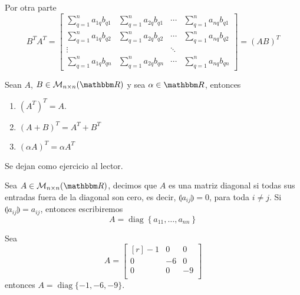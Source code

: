 \begin{theorem}
    Por otra parte
    $$B^T A^T = \begin{bmatrix}
        \displaystyle\sum_{q=1}^{n} a_{1q}b_{q1} & \displaystyle\sum_{q=1}^{n} a_{2q}b_{q1} & \cdots & \displaystyle\sum_{q=1}^{n} a_{nq}b_{q1} \\
        \displaystyle\sum_{q=1}^{n} a_{1q}b_{q2} & \displaystyle\sum_{q=1}^{n} a_{2q}b_{q2} & \cdots & \displaystyle\sum_{q=1}^{n} a_{nq}b_{q2} \\
        \vdots & & \ddots & \\
        \displaystyle\sum_{q=1}^{n} a_{1q}b_{qn} & \displaystyle\sum_{q=1}^{n} a_{2q}b_{qn} & \cdots & \displaystyle\sum_{q=1}^{n} a_{nq}b_{qn} 
    \end{bmatrix} = (AB)^T$$
\end{theorem}

\begin{proposition}\label{propiedades_transpuesta}
    Sean $A$, $B \in \mathcal{M}_{n \times n}(\RR)$ y sea $\alpha \in \RR$, entonces
    \begin{enumerate}[label=\roman*.]
        \item $\left(A^T\right)^T = A$.
        \item $(A + B)^T = A^T + B^T$
        \item $(\alpha A)^T = \alpha A^T$
    \end{enumerate}
    \demostracion Se dejan como ejercicio al lector.
\end{proposition}

\begin{definition}
    Sea $A \in \mathcal{M}_{n \times n}(\RR)$, decimos que $A$ es una matriz diagonal si todas sus entradas fuera de la diagonal son cero, es decir, $\llparenthesis a_{ij} \rrparenthesis = 0$, para toda $i \neq j$. Si $\llparenthesis a_{ij} \rrparenthesis = a_{ij}$, entonces escribiremos $$A = \operatorname{diag} \left\lbrace a_{11}, \dots, a_{nn} \right\rbrace$$
\end{definition}

\begin{example}
    Sea
    $$A = \begin{bmatrix*}[r]
        -1 & 0 & 0 \\
        0 & -6 & 0 \\
        0 & 0 & -9 \\
    \end{bmatrix*}$$
    entonces $A = \operatorname{diag} \{ -1, -6, -9 \}$.
\end{example}

